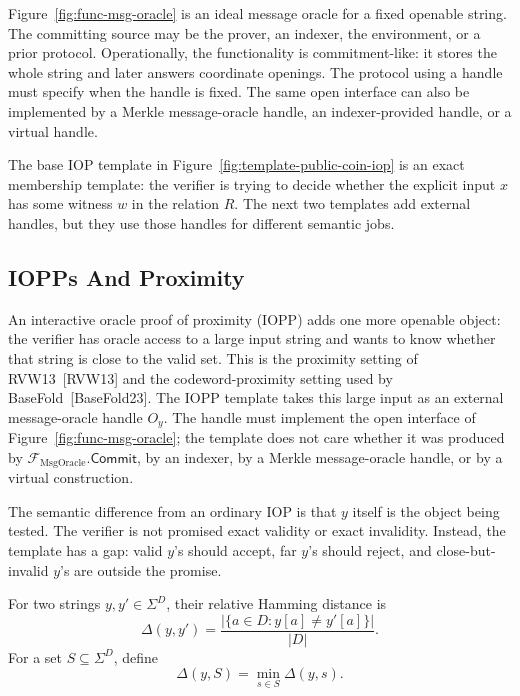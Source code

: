 Figure~\ref{fig:func-msg-oracle} is an ideal message oracle for a fixed
openable string.  The committing source may be the prover, an indexer, the
environment, or a prior protocol.  Operationally, the functionality is
commitment-like: it stores the whole string and later answers coordinate
openings.
The protocol using a handle must specify when the handle is fixed.  The same
open interface can also be implemented by a Merkle message-oracle handle, an
indexer-provided handle, or a virtual handle.

The base IOP template in Figure~\ref{fig:template-public-coin-iop} is an exact
membership template: the verifier is trying to decide whether the explicit input
\(x\) has some witness \(w\) in the relation \(R\).  The next two templates add
external handles, but they use those handles for different semantic jobs.

\subsection{IOPPs And Proximity}

An interactive oracle proof of proximity (IOPP) adds one more openable object:
the verifier has oracle access to a large input string and wants to know whether
that string is close to the valid set.  This is the proximity setting of
RVW13~[RVW13] and the codeword-proximity setting used by BaseFold~[BaseFold23].
The IOPP template takes this large input as an external message-oracle handle
\(O_y\).  The handle must implement the open interface of
Figure~\ref{fig:func-msg-oracle}; the template does not care whether it was
produced by \(\mathcal F_{\mathrm{MsgOracle}}.\mathsf{Commit}\), by an indexer,
by a Merkle message-oracle handle, or by a virtual construction.

The semantic difference from an ordinary IOP is that \(y\) itself is the object
being tested.  The verifier is not promised exact validity or exact invalidity.
Instead, the template has a gap: valid \(y\)'s should accept, far \(y\)'s should
reject, and close-but-invalid \(y\)'s are outside the promise.

For two strings \(y,y'\in\Sigma^D\), their relative Hamming distance is
\[
  \Delta(y,y')
  =
  \frac{|\{a\in D:y[a]\ne y'[a]\}|}{|D|}.
\]
For a set \(S\subseteq\Sigma^D\), define
\[
  \Delta(y,S)=\min_{s\in S}\Delta(y,s).
\]

